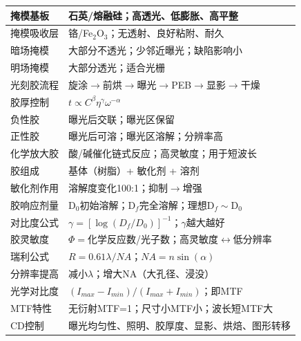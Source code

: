 \documentclass[UTF8,12pt,a4paper]{ctexart}
\begin{document}
\begin{longtable}{|L{4.5cm}|L{10.5cm}|}
掩模基板 & 石英/熔融硅；高透光、低膨胀、高平整 \\
\hline

掩模吸收层 & 铬/Fe$_2$O$_3$；无透射、良好粘附、耐久 \\
\hline

暗场掩模 & 大部分不透光；少邻近曝光；缺陷影响小 \\
\hline

明场掩模 & 大部分透光；适合光栅 \\
\hline

光刻胶流程 & 旋涂$\rightarrow$前烘$\rightarrow$曝光$\rightarrow$PEB$\rightarrow$显影$\rightarrow$干燥 \\
\hline

胶厚控制 & $t \propto C^\beta \eta^\gamma \omega^{-\alpha}$ \\
\hline

负性胶 & 曝光后交联；曝光区保留 \\
\hline

正性胶 & 曝光后可溶；曝光区溶解；分辨率高 \\
\hline

化学放大胶 & 酸/碱催化链式反应；高灵敏度；用于短波长 \\
\hline

胶组成 & 基体（树脂）+ 敏化剂 + 溶剂 \\
\hline

敏化剂作用 & 溶解度变化100:1；抑制$\rightarrow$增强 \\
\hline

胶响应剂量 & D$_0$初始溶解；D$_f$完全溶解；理想D$_f\sim$D$_0$ \\
\hline

对比度公式 & $\gamma=[\log(D_f/D_0)]^{-1}$；$\gamma$越大越好 \\
\hline

胶灵敏度 & $\Phi=$化学反应数/光子数；高灵敏度$\leftrightarrow$低分辨率 \\
\hline

瑞利公式 & $R=0.61\lambda/NA$；$NA=n\sin(\alpha)$ \\
\hline

分辨率提高 & 减小$\lambda$；增大NA（大孔径、浸没） \\
\hline

光学对比度 & $(I_{max}-I_{min})/(I_{max}+I_{min})$；即MTF \\
\hline

MTF特性 & 无衍射MTF=1；尺寸小MTF小；波长短MTF大 \\
\hline

CD控制 & 曝光均匀性、照明、胶厚度、显影、烘焙、图形转移 \\
\hline


\end{longtable}
\end{document}
